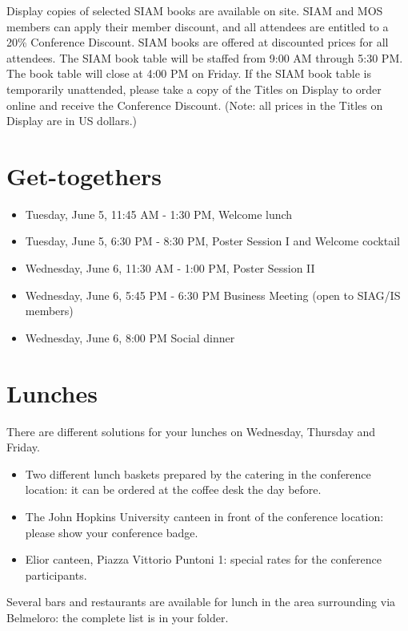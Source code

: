 Display copies of selected SIAM books are available on site. SIAM and MOS members can apply their member discount, and all attendees are entitled to a 20\% Conference Discount. SIAM books are offered at discounted prices for all attendees. The SIAM book table will be staffed from 9:00 AM through 5:30 PM. The book table will close at 4:00 PM on Friday.  If the SIAM book table is temporarily unattended, please take a copy of the Titles on Display to order online and receive the Conference Discount. (Note: all prices in the Titles on Display are in US dollars.)   

\section*{Get-togethers}

\begin{itemize}
  \item[] Tuesday, June 5, 11:45 AM - 1:30 PM, Welcome lunch
  \item[] Tuesday, June 5, 6:30 PM - 8:30 PM, Poster Session I and Welcome cocktail
  \item[] Wednesday, June 6, 11:30 AM - 1:00 PM, Poster Session II
  \item[] Wednesday, June 6, 5:45 PM - 6:30 PM Business Meeting (open to SIAG/IS members)
  \item[] Wednesday, June 6, 8:00 PM Social dinner
\end{itemize}

\section*{Lunches}
There are different solutions for your lunches on Wednesday, Thursday and Friday. 
\begin{itemize}
  \item[] Two different lunch baskets prepared by the catering in the conference location: it can be ordered at the coffee desk the day before.
  \item[] The John Hopkins University canteen in front of the conference location: please show your conference badge.
  \item[] Elior canteen, Piazza Vittorio Puntoni 1: special rates for the conference participants.
\end{itemize}
Several bars and restaurants are available for lunch in the area surrounding via Belmeloro: the complete list is in your folder.

